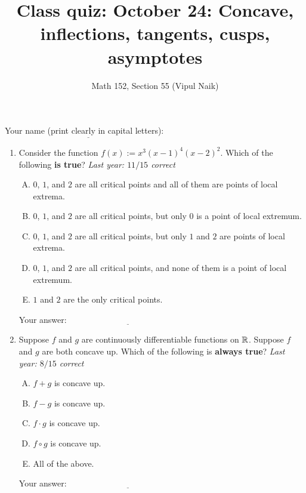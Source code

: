 \documentclass[10pt]{amsart}
\title{Class quiz: October 24: Concave, inflections, tangents, cusps, asymptotes}
\author{Math 152, Section 55 (Vipul Naik)}
\begin{document}
\maketitle

Your name (print clearly in capital letters): $\underline{\qquad\qquad\qquad\qquad\qquad\qquad\qquad\qquad\qquad\qquad}$

\begin{enumerate}

\item Consider the function $f(x) := x^3(x - 1)^4(x - 2)^2$. Which of
  the following {\bf is true}? {\em Last year: $11/15$ correct}

  \begin{enumerate}[(A)]
  \item $0$, $1$, and $2$ are all critical points and all of them are
    points of local extrema.
  \item $0$, $1$, and $2$ are all critical points, but only $0$ is a
    point of local extremum.
  \item $0$, $1$, and $2$ are all critical points, but only $1$ and
    $2$ are points of local extrema.
  \item $0$, $1$, and $2$ are all critical points, and none of them is
    a point of local extremum.
  \item $1$ and $2$ are the only critical points.
  \end{enumerate}

  \vspace{0.1in}
  Your answer: $\underline{\qquad\qquad\qquad\qquad\qquad\qquad\qquad}$
  \vspace{0.6in}

\item Suppose $f$ and $g$ are continuously differentiable functions on
  $\mathbb{R}$. Suppose $f$ and $g$ are both concave up. Which of the
  following is {\bf always true}? {\em Last year: $8/15$ correct}

  \begin{enumerate}[(A)]
  \item $f + g$ is concave up.
  \item $f - g$ is concave up.
  \item $f \cdot g$ is concave up.
  \item $f \circ g$ is concave up.
  \item All of the above.
  \end{enumerate}

  \vspace{0.1in}
  Your answer: $\underline{\qquad\qquad\qquad\qquad\qquad\qquad\qquad}$
  \vspace{0.6in}


\end{enumerate}
\end{document}
